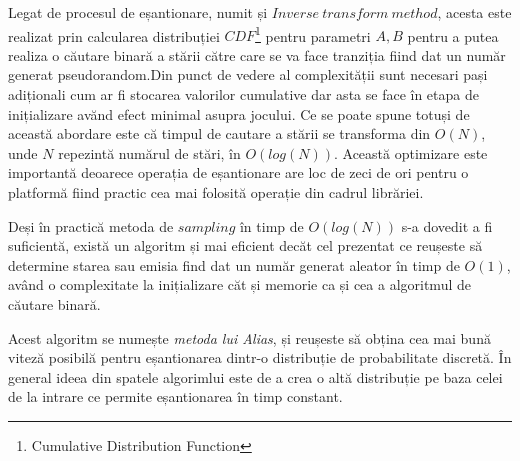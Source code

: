 Legat de procesul de eșantionare, numit și $Inverse \ transform \ method$, acesta este realizat prin calcularea distribuției $CDF$\footnote{Cumulative Distribution Function} pentru parametri $A,B$ pentru a putea realiza o căutare binară a stării către care se va face tranziția fiind dat un număr generat pseudorandom.Din punct de vedere al complexității sunt necesari pași adiționali cum ar fi stocarea valorilor cumulative dar asta se face în etapa de inițializare avănd efect minimal asupra jocului. Ce se poate spune totuși de această abordare este că timpul de cautare a stării se transforma din $O(N)$, unde $N$ repezintă numărul de stări, în $O(log(N))$. Această optimizare este importantă deoarece operația de eșantionare are loc de zeci de ori pentru o platformă fiind practic cea mai folosită operație din cadrul librăriei.\par

Deși în practică metoda de $sampling$ în timp de $O(log(N))$ s-a dovedit a fi suficientă, există un algoritm și mai eficient decăt cel prezentat ce reușeste să determine starea sau emisia find dat un număr generat aleator în timp de $O(1)$, având o complexitate la inițializare căt și memorie ca și cea a algoritmul de căutare binară.\par

Acest algoritm se numește \textit{metoda lui Alias}, și reușeste să obțina cea mai bună viteză posibilă pentru eșantionarea dintr-o distribuție de probabilitate discretă. În general ideea din spatele algorimlui este de a crea o altă distribuție pe baza celei de la intrare ce permite eșantionarea în timp constant.\par
